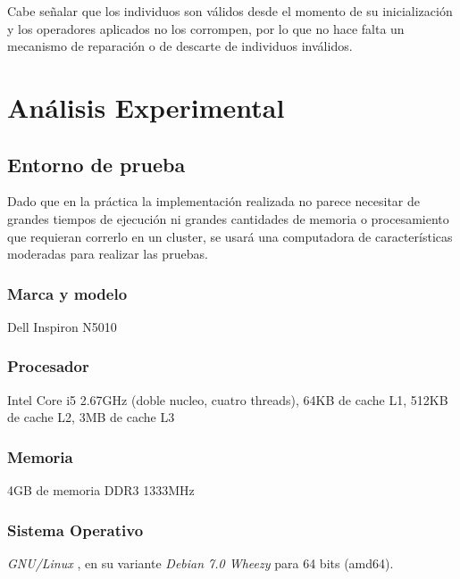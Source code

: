 \documentclass[journal]{IEEEtran}
\begin{document}
Cabe señalar que los individuos son válidos desde el momento de su inicialización y los operadores aplicados no los corrompen, por lo que no hace falta un mecanismo de reparación o de descarte de individuos inválidos.

\section{Análisis Experimental}

\subsection{Entorno de prueba}

Dado que en la práctica la implementación realizada no parece necesitar de grandes tiempos de ejecución ni grandes cantidades de memoria o procesamiento que requieran correrlo en un cluster, se usará una computadora de características moderadas para realizar las pruebas.\\

\subsubsection{Marca y modelo}

Dell Inspiron N5010\\

\subsubsection{Procesador}

Intel Core i5 2.67GHz (doble nucleo, cuatro threads), 64KB de cache L1, 512KB de cache L2, 3MB de cache L3\\

\subsubsection{Memoria}

4GB de memoria DDR3 1333MHz\\

\subsubsection{Sistema Operativo}

\emph{GNU/Linux} \cite{gnu} \cite{linux}, en su variante \emph{Debian 7.0 Wheezy} \cite{debian:stable} para 64 bits (amd64).\\
\end{document}
